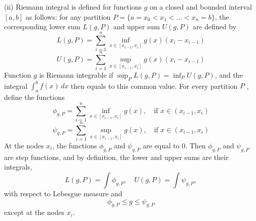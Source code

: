 \documentclass[12pt]{article}
\begin{document}
\vspace{8pt}

(ii) Riemann integral is defined for functions $g$ on a closed and bounded interval $[a, b]$ as follows: for any partition $P = \{ a = x_{0} < x_{1} < \dots < x_{n} = b\}$, the corresponding lower sum $L(g, P)$ and upper sum $U(g, P)$ are defined by
\begin{equation*}
    L(g, P) = \sum_{i = 1}^{n} \inf_{x \in [x_{i-1}, x_{i}]} g(x) (x_{i} - x_{i-1})
\end{equation*}
\begin{equation*}
    U(g, P) = \sum_{i = 1}^{n} \sup_{x \in [x_{i-1}, x_{i}]} g(x) (x_{i} - x_{i-1})
\end{equation*}
Function $g$ is Riemann integrable if $\sup_{P} L(g, P) = \inf_{P} U(g, P)$, and the integral $\int_{a}^{b} f(x) \, d x$ then equals to this common value. For every partition $P$ , define the functions
\begin{equation*}
    \phi_{g, P} = \sum_{i = 1}^{n} \inf_{x \in [x_{i-1}, x_{i}]} g(x), \quad \text{if} \, \,   x \in (x_{i-1}, x_{i})
\end{equation*}
\begin{equation*}
    \psi_{g, P} = \sum_{i = 1}^{n} \sup_{x \in [x_{i-1}, x_{i}]} g(x), \quad \text{if} \, \,  x \in (x_{i-1}, x_{i})
\end{equation*}
At the nodes $x_{i}$, the functions $\phi_{g, P}$ and $\psi_{g, P}$ are equal to $0$. Then $\phi_{g, P}$ and $\psi_{g, P}$ are step functions, and by definition, the lower and upper sums are their integrals,
\begin{equation*}
     L(g, P) = \int \phi_{g, P} , \quad  U(g, P) = \int \psi_{g, P} , 
\end{equation*}
with respect to Lebesgue measure and 
\begin{equation*}
    \phi_{g, P} \leq g \leq \psi_{g, P}
\end{equation*}
except at the nodes $x_{i}$.
\end{document}
